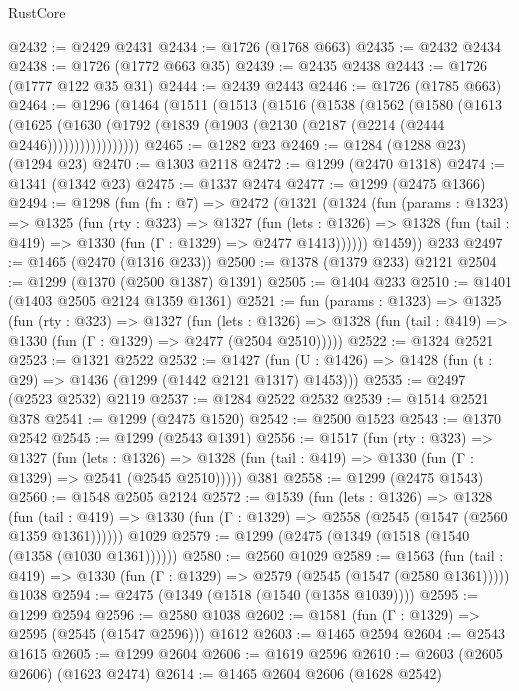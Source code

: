 \begin{lexlean}{RustCore}
\begin{coremodule}
@2432 := @2429 @2431
@2434 := @1726 (@1768 @663)
@2435 := @2432 @2434
@2438 := @1726 (@1772 @663 @35)
@2439 := @2435 @2438
@2443 := @1726 (@1777 @122 @35 @31)
@2444 := @2439 @2443
@2446 := @1726 (@1785 @663)
@2464 := @1296
    (@1464
      (@1511
        (@1513
          (@1516
            (@1538
              (@1562
                (@1580
                  (@1613
                    (@1625
                      (@1630 (@1792 (@1839 (@1903 (@2130 (@2187 (@2214 (@2444 @2446)))))))))))))))))
@2465 := @1282 @23
@2469 := @1284 (@1288 @23) (@1294 @23)
@2470 := @1303 @2118
@2472 := @1299 (@2470 @1318)
@2474 := @1341 (@1342 @23)
@2475 := @1337 @2474
@2477 := @1299 (@2475 @1366)
@2494 := @1298
    (fun (fn : @7) =>
    @2472
      (@1321
        (@1324
          (fun (params : @1323) =>
          @1325
            (fun (rty : @323) =>
            @1327
              (fun (lets : @1326) =>
              @1328 (fun (tail : @419) => @1330 (fun (Γ : @1329) => @2477 @1413))))))
        @1459))
    @233
@2497 := @1465 (@2470 (@1316 @233))
@2500 := @1378 (@1379 @233) @2121
@2504 := @1299 (@1370 (@2500 @1387) @1391)
@2505 := @1404 @233
@2510 := @1401 (@1403 @2505 @2124 @1359 @1361)
@2521 := fun (params : @1323) =>
  @1325
    (fun (rty : @323) =>
    @1327
      (fun (lets : @1326) =>
      @1328 (fun (tail : @419) => @1330 (fun (Γ : @1329) => @2477 (@2504 @2510)))))
@2522 := @1324 @2521
@2523 := @1321 @2522
@2532 := @1427 (fun (U : @1426) => @1428 (fun (t : @29) => @1436 (@1299 (@1442 @2121 @1317) @1453)))
@2535 := @2497 (@2523 @2532) @2119
@2537 := @1284 @2522 @2532
@2539 := @1514 @2521 @378
@2541 := @1299 (@2475 @1520)
@2542 := @2500 @1523
@2543 := @1370 @2542
@2545 := @1299 (@2543 @1391)
@2556 := @1517
    (fun (rty : @323) =>
    @1327
      (fun (lets : @1326) =>
      @1328 (fun (tail : @419) => @1330 (fun (Γ : @1329) => @2541 (@2545 @2510)))))
    @381
@2558 := @1299 (@2475 @1543)
@2560 := @1548 @2505 @2124
@2572 := @1539
    (fun (lets : @1326) =>
    @1328
      (fun (tail : @419) => @1330 (fun (Γ : @1329) => @2558 (@2545 (@1547 (@2560 @1359 @1361))))))
    @1029
@2579 := @1299 (@2475 (@1349 (@1518 (@1540 (@1358 (@1030 @1361))))))
@2580 := @2560 @1029
@2589 := @1563
    (fun (tail : @419) => @1330 (fun (Γ : @1329) => @2579 (@2545 (@1547 (@2580 @1361)))))
    @1038
@2594 := @2475 (@1349 (@1518 (@1540 (@1358 @1039))))
@2595 := @1299 @2594
@2596 := @2580 @1038
@2602 := @1581 (fun (Γ : @1329) => @2595 (@2545 (@1547 @2596))) @1612
@2603 := @1465 @2594
@2604 := @2543 @1615
@2605 := @1299 @2604
@2606 := @1619 @2596
@2610 := @2603 (@2605 @2606) (@1623 @2474)
@2614 := @1465 @2604 @2606 (@1628 @2542)

\end{coremodule}
\end{lexlean}
